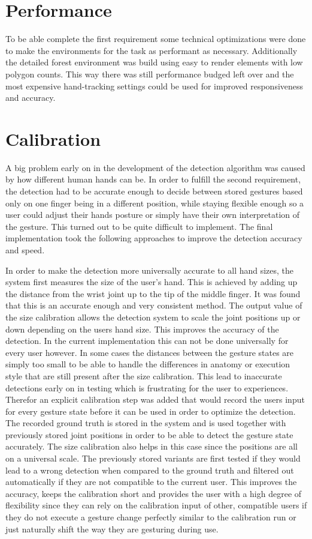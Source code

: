 \section{Performance}
To be able complete the first requirement some technical optimizations were done to make the environments for the task as performant as necessary. Additionally the detailed forest environment was build using easy to render elements with low polygon counts. This way there was still performance budged left over and the most expensive hand-tracking settings could be used for improved responsiveness and accuracy.

\section{Calibration}
A big problem early on in the development of the detection algorithm was caused by how different human hands can be. In order to fulfill the second requirement, the detection had to be accurate enough to decide between stored gestures based only on one finger being in a different position, while staying flexible enough so a user could adjust their hands posture or simply have their own interpretation of the gesture. This turned out to be quite difficult to implement. The final implementation took the following approaches to improve the detection accuracy and speed.

In order to make the detection more universally accurate to all hand sizes, the system first measures the size of the user's hand. This is achieved by adding up the distance from the wrist joint up to the tip of the middle finger. It was found that this is an accurate enough and very consistent method. The output value of the size calibration allows the detection system to scale the joint positions up or down depending on the users hand size. This improves the accuracy of the detection. In the current implementation this can not be done universally for every user however. In some cases the distances between the gesture states are simply too small to be able to handle the differences in anatomy or execution style that are still present after the size calibration. This lead to inaccurate detections early on in testing which is frustrating for the user to experiences. Therefor an explicit calibration step was added that would record the users input for every gesture state before it can be used in order to optimize the detection. The recorded ground truth is stored in the system and is used together with previously stored joint positions in order to be able to detect the gesture state accurately. The size calibration also helps in this case since the positions are all on a universal scale. The previously stored variants are first tested if they would lead to a wrong detection when compared to the ground truth and filtered out automatically if they are not compatible to the current user. This improves the accuracy, keeps the calibration short and provides the user with a high degree of flexibility since they can rely on the calibration input of other, compatible users if they do not execute a gesture change perfectly similar to the calibration run or just naturally shift the way they are gesturing during use.


